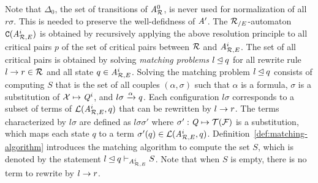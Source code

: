 Note that $\Delta_0$, the set of transitions of ${\it A}_{\mathcal R}^0$, is never
used for normalization of all $r\sigma$. This is needed to preserve
the well-defidness of $\mathit A'$.  The ${\mathcal R_{/E}}$-automaton $\mathtt{C}({\it A}_{\mathcal R,E}^i)$
is obtained by recursively applying the above resolution principle to
all critical pairs $p$ of the set of critical pairs between $\mathcal R$ and
${\it A}_{\mathcal R,E}^i$. The set of all critical pairs is obtained by solving {\em
  matching problems} $l \unlhd q$ for all rewrite rule $l \rightarrow r\in \mathcal R$
and all state $q\in{\it A}_{\mathcal R,E}^i$.  Solving the matching problem $l \unlhd
q$ consists of computing $S$ that is the set of all couples $(\alpha,
\sigma)$ such that $\alpha$ is a formula, $\sigma$ is a substitution
of $\mathcal X \mapsto \mathit Q^i$, and $l\sigma \xrightarrow{\alpha} q$. Each configuration
$l\sigma$ corresponds to a subset of terms of $\mathcal{L}({\it A}_{\mathcal R,E}^i, q)$
that can be rewritten by $l \rightarrow r$. The terms characterized by
$l\sigma$ are defined as $l\sigma\sigma'$ where $\sigma': \mathit Q \mapsto
\mathcal{T(F)}$ is a substitution, which maps each state $q$ to a term
$\sigma'(q) \in \mathcal{L}({\it A}_{\mathcal R,E}^i,
q)$. Definition~\ref{def:matching-algorithm} introduces the matching
algorithm to compute the set $S$, which is denoted by the statement $l
\unlhd q \vdash_{{\it A}_{\mathcal R,E}^i} S$. Note that when $S$ is empty, there is
no term to rewrite by $l \rightarrow r$.

